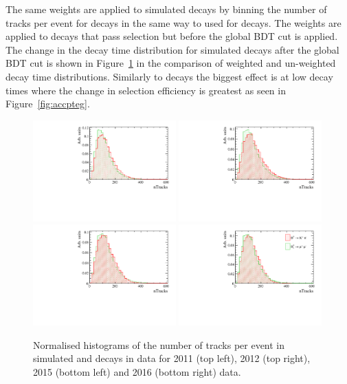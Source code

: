The same weights are applied to simulated \bsmumu decays by binning the number of tracks per event for \bsmumu decays in the same way to used for \bdkpi decays. The weights are applied to decays that pass selection but before the global BDT cut is applied. The change in the decay time distribution for \bsmuu simulated decays after the global BDT cut is shown in Figure~\ref{fig:BsmmVsBdToKpinTracks} in the comparison of weighted and un-weighted \bsmumu decay time distributions. Similarly to \bdkpi decays the biggest effect is at low decay times where the change in selection efficiency is greatest as seen in Figure~\ref{fig:accpteg}.
\begin{figure}[htbp]
  \centering
    \includegraphics[width=0.49\textwidth]{./Figs/LifetimeMeasurement/nTracks_2011_Bs2MuMu_Bd2KPi.pdf}
    \includegraphics[width=0.49\textwidth]{./Figs/LifetimeMeasurement/nTracks_2012_Bs2MuMu_Bd2KPi.pdf}
    \includegraphics[width=0.49\textwidth]{./Figs/LifetimeMeasurement/nTracks_2015_Bs2MuMu_Bd2KPi.pdf}
    \includegraphics[width=0.49\textwidth]{./Figs/LifetimeMeasurement/nTracks_2016_Bs2MuMu_Bd2KPi.pdf}
  \caption{Normalised histograms of the number of tracks per event in simulated \bdkpi and \bsmumu decays in data for 2011 (top left), 2012 (top right), 2015 (bottom left) and 2016 (bottom right) data. }
  \label{fig:BsmmVsBdToKpinTracks}
\end{figure}

